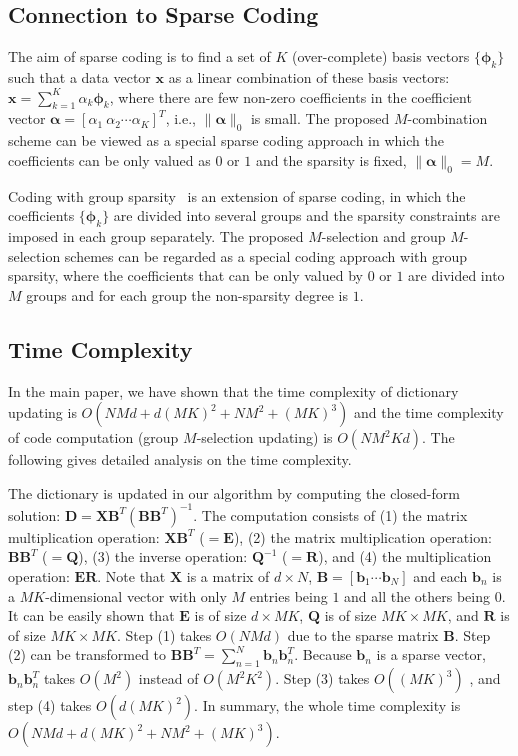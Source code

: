 \documentclass[10pt, letterpaper]{article}
\begin{document}
\subsection{Connection to Sparse Coding}
The aim of sparse coding is
to find a set of $K$ (over-complete) basis vectors
$\{\boldsymbol{\phi}_k\}$
such that
a data vector $\mathbf{x}$ as a linear combination
of these basis vectors:
$\mathbf{x} = \sum_{k=1}^K \alpha_k\boldsymbol{\phi}_k$,
where there are few non-zero coefficients
in the coefficient vector $\boldsymbol{\alpha} = [\alpha_1~\alpha_2\cdots \alpha_K]^T$,
i.e., $\|\boldsymbol{\alpha}\|_0$ is small.
The proposed $M$-combination scheme
can be viewed as a special sparse coding approach
in which the coefficients can be only valued as $0$ or $1$
and the sparsity is fixed, $\|\boldsymbol{\alpha}\|_0 = M$.

Coding with group sparsity~\cite{YuanL06}
is an extension of sparse coding,
in which the coefficients
$\{\boldsymbol{\phi}_k\}$ are divided into several groups
and the sparsity constraints are imposed in each group separately.
The proposed $M$-selection and group $M$-selection schemes
can be regarded as a special coding approach
with group sparsity,
where the coefficients that can be only
valued by $0$ or $1$
are divided into $M$ groups
and for each group the non-sparsity degree is $1$.

\subsection{Time Complexity}
In the main paper,
we have shown that
the time complexity of dictionary updating is $O(NMd + d (MK)^2 + NM^2 + (MK)^3)$
and the time complexity of code computation (group $M$-selection updating)
is $O(NM^2Kd)$.
The following gives detailed analysis on the time complexity.

The dictionary is updated in our algorithm
by computing the closed-form solution:
$\mathbf{D} = \mathbf{X}\mathbf{B}^T(\mathbf{B}\mathbf{B}^T)^{-1}$.
The computation consists of
(1) the matrix multiplication operation: $\mathbf{X}\mathbf{B}^T$ ($=\mathbf{E}$),
(2) the matrix multiplication operation: $\mathbf{B}\mathbf{B}^T$ ($=\mathbf{Q}$),
(3) the inverse operation: $\mathbf{Q}^{-1}$ ($=\mathbf{R}$),
and (4) the multiplication operation: $\mathbf{E}\mathbf{R}$.
Note that $\mathbf{X}$ is a matrix of $d\times N$,
$\mathbf{B} = [\mathbf{b}_1\cdots\mathbf{b}_N]$
and each $\mathbf{b}_n$ is a $MK$-dimensional vector
with only $M$ entries being $1$ and all the others being $0$.
It can be easily shown that
$\mathbf{E}$ is of size $d \times MK$,
$\mathbf{Q}$ is of size $MK \times MK$,
and $\mathbf{R}$ is of size $MK \times MK$.
Step (1) takes $O(NMd)$ due to the sparse matrix $\mathbf{B}$.
Step (2) can be transformed to $\mathbf{B}\mathbf{B}^T = \sum_{n=1}^N\mathbf{b}_n\mathbf{b}_n^T$.
Because $\mathbf{b}_n$ is a sparse vector,
$\mathbf{b}_n\mathbf{b}_n^T$ takes $O(M^2)$ instead of $O(M^2K^2)$.
Step (3) takes $O((MK)^3)$ ,
and step (4) takes $O(d(MK)^2)$.
In summary, the whole time complexity is $O(NMd + d (MK)^2 + NM^2 + (MK)^3)$.
\end{document}
